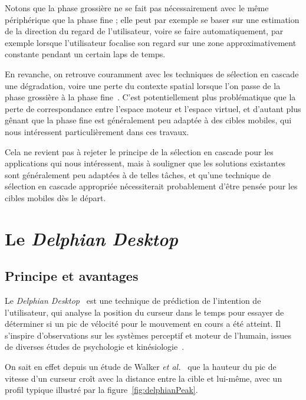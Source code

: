 	Notons que la phase grossière ne se fait pas nécessairement avec le même périphérique que la phase fine ; elle peut par exemple se baser sur une estimation de la direction du regard de l'utilisateur, voire se faire automatiquement, par exemple lorsque l'utilisateur focalise son regard sur une zone approximativement constante pendant un certain laps de temps.
	
	En revanche, on retrouve couramment avec les techniques de sélection en cascade une dégradation, voire une perte du contexte spatial lorsque l'on passe de la phase grossière à la phase fine~\cite{kopper2011rapid, debarba2013disambiguation}. C'est potentiellement plus problématique que la perte de correspondance entre l'espace moteur et l'espace virtuel, et d'autant plus gênant que la phase fine est généralement peu adaptée à des cibles mobiles, qui nous intéressent particulièrement dans ces travaux.
	
	Cela ne revient pas à rejeter le principe de la sélection en cascade pour les applications qui nous intéressent, mais à souligner que les solutions existantes sont généralement peu adaptées à de telles tâches, et qu'une technique de sélection en cascade appropriée nécessiterait probablement d'être pensée pour les cibles mobiles dès le départ.	

	
\section{Le \emph{Delphian Desktop}}
	\subsection{Principe et avantages}
	Le \emph{Delphian Desktop}~\cite{asano2005predictive} est une technique de prédiction de l'intention de l'utilisateur, qui analyse la position du curseur dans le temps pour essayer de déterminer si un pic de vélocité pour le mouvement en cours a été atteint. Il s'inspire d'observations sur les systèmes perceptif et moteur de l'humain, issues de diverses études de psychologie et kinésiologie~\cite{accot2003refining, graham1995pointing, graham1996physical, mackenzie1992extending, mackenzie1994prediction, takagi2002fundamental, walker1993spatial}.
	
	On sait en effet depuis un étude de Walker \emph{et al.}~\cite{walker1993spatial} que la hauteur du pic de vitesse d'un curseur croît avec la distance entre la cible et lui-même, avec un profil typique illustré par la figure~\ref{fig:delphianPeak}.
	
